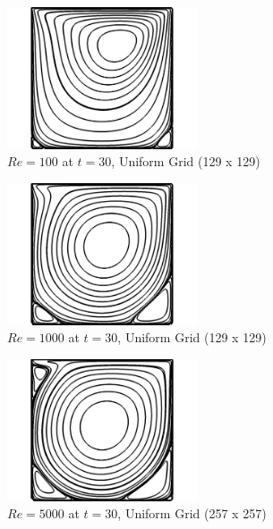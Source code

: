 \documentclass[twocolumn,10pt]{asme2ej}
\begin{document}
\begin{figure}[htb]
\begin{center}
\includegraphics[width=0.5\textwidth]{figure/Re100.png}
\caption{$Re = 100$ at $t = 30$, Uniform Grid (129 x 129)}
\end{center}
\end{figure}

\begin{figure}[htb]
\begin{center}
\includegraphics[width=0.5\textwidth]{figure/Re1000.png}
\caption{$Re = 1000$ at $t = 30$, Uniform Grid (129 x 129)}
\end{center}
\end{figure}

\begin{figure}[htb]
\begin{center}
\includegraphics[width=0.5\textwidth]{figure/Re5000.png}
\caption{$Re = 5000$ at $t = 30$, Uniform Grid (257 x 257)}
\end{center}
\end{figure}
\end{document}
